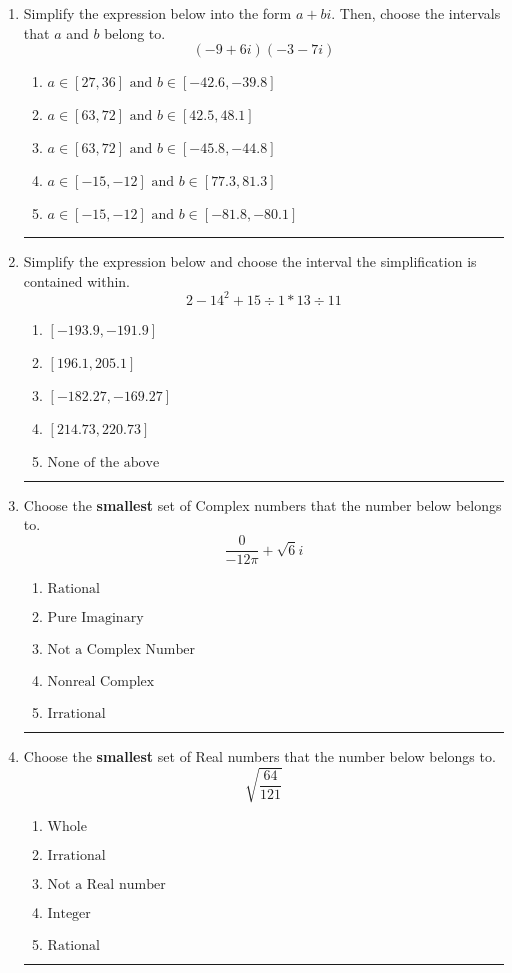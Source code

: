 \documentclass[14pt]{extbook}
\newcommand{\litem}[1]{\item#1\hspace*{-1cm}\rule{\textwidth}{0.4pt}}
\begin{document}
\begin{enumerate}
\litem{
Simplify the expression below into the form $a+bi$. Then, choose the intervals that $a$ and $b$ belong to.\[ (-9 + 6 i)(-3 - 7 i) \]\begin{enumerate}[label=\Alph*.]
\item \( a \in [27, 36] \text{ and } b \in [-42.6, -39.8] \)
\item \( a \in [63, 72] \text{ and } b \in [42.5, 48.1] \)
\item \( a \in [63, 72] \text{ and } b \in [-45.8, -44.8] \)
\item \( a \in [-15, -12] \text{ and } b \in [77.3, 81.3] \)
\item \( a \in [-15, -12] \text{ and } b \in [-81.8, -80.1] \)

\end{enumerate} }
\litem{
Simplify the expression below and choose the interval the simplification is contained within.\[ 2 - 14^2 + 15 \div 1 * 13 \div 11 \]\begin{enumerate}[label=\Alph*.]
\item \( [-193.9, -191.9] \)
\item \( [196.1, 205.1] \)
\item \( [-182.27, -169.27] \)
\item \( [214.73, 220.73] \)
\item \( \text{None of the above} \)

\end{enumerate} }
\litem{
Choose the \textbf{smallest} set of Complex numbers that the number below belongs to.\[ \frac{0}{-12 \pi}+\sqrt{6}i \]\begin{enumerate}[label=\Alph*.]
\item \( \text{Rational} \)
\item \( \text{Pure Imaginary} \)
\item \( \text{Not a Complex Number} \)
\item \( \text{Nonreal Complex} \)
\item \( \text{Irrational} \)

\end{enumerate} }
\litem{
Choose the \textbf{smallest} set of Real numbers that the number below belongs to.\[ \sqrt{\frac{64}{121}} \]\begin{enumerate}[label=\Alph*.]
\item \( \text{Whole} \)
\item \( \text{Irrational} \)
\item \( \text{Not a Real number} \)
\item \( \text{Integer} \)
\item \( \text{Rational} \)


\end{enumerate}}
\end{enumerate}
\end{document}
